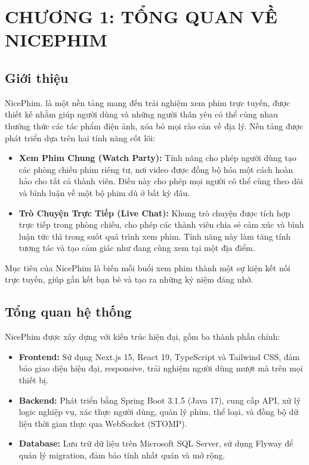
\newpage

\section{CHƯƠNG 1: TỔNG QUAN VỀ NICEPHIM }

\subsection{Giới thiệu}

NicePhim. là một nền tảng mang đến trải nghiệm xem phim trực tuyến, được thiết kế nhằm giúp người dùng và những người thân yêu có thể cùng nhau thưởng thức các tác phẩm điện ảnh, xóa bỏ mọi rào cản về địa lý. Nền tảng được phát triển dựa trên hai tính năng cốt lõi:

\begin{itemize}
	\item \textbf{Xem Phim Chung (Watch Party):} Tính năng cho phép người dùng tạo các phòng chiếu phim riêng tư, nơi video được đồng bộ hóa một cách hoàn hảo cho tất cả thành viên. Điều này cho phép mọi người có thể cùng theo dõi và bình luận về một bộ phim dù ở bất kỳ đâu.

	\item \textbf{Trò Chuyện Trực Tiếp (Live Chat):} Khung trò chuyện được tích hợp trực tiếp trong phòng chiếu, cho phép các thành viên chia sẻ cảm xúc và bình luận tức thì trong suốt quá trình xem phim. Tính năng này làm tăng tính tương tác và tạo cảm giác như đang cùng xem tại một địa điểm.
\end{itemize}

Mục tiêu của NicePhim là biến mỗi buổi xem phim thành một sự kiện kết nối trực tuyến, giúp gắn kết bạn bè và tạo ra những kỷ niệm đáng nhớ.


\subsection{Tổng quan hệ thống}

NicePhim được xây dựng với kiến trúc hiện đại, gồm ba thành phần chính:
\begin{itemize}
	\item \textbf{Frontend:} Sử dụng Next.js 15, React 19, TypeScript và Tailwind CSS, đảm bảo giao diện hiện đại, responsive, trải nghiệm người dùng mượt mà trên mọi thiết bị.
	\item \textbf{Backend:} Phát triển bằng Spring Boot 3.1.5 (Java 17), cung cấp API, xử lý logic nghiệp vụ, xác thực người dùng, quản lý phim, thể loại, và đồng bộ dữ liệu thời gian thực qua WebSocket (STOMP).
	\item \textbf{Database:} Lưu trữ dữ liệu trên Microsoft SQL Server, sử dụng Flyway để quản lý migration, đảm bảo tính nhất quán và mở rộng.
\end{itemize}

